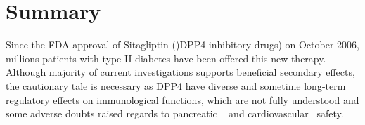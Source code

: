 \section{\label{chap:Sum} Summary}
Since the FDA approval of Sitagliptin ()DPP4 inhibitory drugs) on October 2006, millions patients with type II diabetes have been offered this new therapy. Although majority of current investigations supports beneficial secondary effects, the cautionary tale is necessary as DPP4 have diverse and sometime long-term regulatory effects on immunological functions, which are not fully understood and some adverse doubts raised regards to pancreatic ~\cite{Egan2014, Jermendy2016} and cardiovascular~\cite{Scirica2013} safety. 

